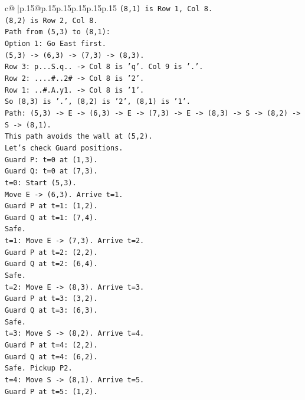 \documentclass{article}
\begin{document}
{\begin{supertabular}{c@{$\;$}|p{.15\linewidth}@{}p{.15\linewidth}p{.15\linewidth}p{.15\linewidth}p{.15\linewidth}p{.15\linewidth}}
{{{\texttt{(8,1) is Row 1, Col 8.} \\
\texttt{(8,2) is Row 2, Col 8.} \\
\texttt{Path from (5,3) to (8,1):} \\
\texttt{Option 1: Go East first.} \\
\texttt{(5,3) {-}> (6,3) {-}> (7,3) {-}> (8,3).} \\
\texttt{Row 3: p...S.q.. {-}> Col 8 is 'q'. Col 9 is '.'.} \\
\texttt{Row 2: ....\#..2\# {-}> Col 8 is '2'.} \\
\texttt{Row 1: ..\#.A.y1. {-}> Col 8 is '1'.} \\
\texttt{So (8,3) is '.', (8,2) is '2', (8,1) is '1'.} \\
\texttt{Path: (5,3) {-}> E {-}> (6,3) {-}> E {-}> (7,3) {-}> E {-}> (8,3) {-}> S {-}> (8,2) {-}> S {-}> (8,1).} \\
\texttt{This path avoids the wall at (5,2).} \\
\texttt{Let's check Guard positions.} \\
\texttt{Guard P: t=0 at (1,3).} \\
\texttt{Guard Q: t=0 at (7,3).} \\
\texttt{t=0: Start (5,3).} \\
\texttt{Move E {-}> (6,3). Arrive t=1.} \\
\texttt{Guard P at t=1: (1,2).} \\
\texttt{Guard Q at t=1: (7,4).} \\
\texttt{Safe.} \\
\texttt{t=1: Move E {-}> (7,3). Arrive t=2.} \\
\texttt{Guard P at t=2: (2,2).} \\
\texttt{Guard Q at t=2: (6,4).} \\
\texttt{Safe.} \\
\texttt{t=2: Move E {-}> (8,3). Arrive t=3.} \\
\texttt{Guard P at t=3: (3,2).} \\
\texttt{Guard Q at t=3: (6,3).} \\
\texttt{Safe.} \\
\texttt{t=3: Move S {-}> (8,2). Arrive t=4.} \\
\texttt{Guard P at t=4: (2,2).} \\
\texttt{Guard Q at t=4: (6,2).} \\
\texttt{Safe. Pickup P2.} \\
\texttt{t=4: Move S {-}> (8,1). Arrive t=5.} \\
\texttt{Guard P at t=5: (1,2).} \\
}}}
\end{supertabular}}
\end{document}

